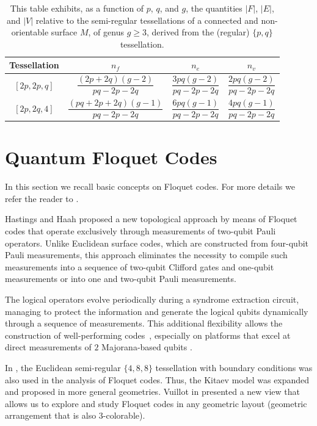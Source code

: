\documentclass[%
reprint,
amsmath,amssymb,
aps,
]{revtex4-2}
\begin{document}
\begin{table}
	\caption{	\label{tabela:N_f-N_e-N_v-tessel-derivada-em-funcao-de-p-q-g-nao-orientavel}
		This table exhibits, as a function of $ p $, $ q $, and $ g $, the quantities $|F| $, $ |E|$, and $|V|$ relative to the semi-regular tessellations of a connected and non-orientable surface $M$, of genus $ g\geq 3 $, derived from the (regular) $\{p,q\}$ tessellation.}
	\begin{ruledtabular}
	\begin{tabular}{||c|c|c|c||}
		Tessellation	&	$ n_f $	&	$ n_e $	& $n_v$ \\	
		\hline	$[2p,2p,q]$	&	$ \dfrac{(2p+2q)(g-2)}{pq-2p-2q} $	&	$ \dfrac{3pq(g-2)}{pq-2p-2q}$	& 	$ \dfrac{2pq(g-2)}{pq-2p-2q}$ \\	
		\hline	$[2p,2q,4]$	&	$ \dfrac{(pq+2p+2q)(g-1)}{pq-2p-2q} $	&	$ \dfrac{6pq(g-1)}{pq-2p-2q} $	&	$ \dfrac{4pq(g-1)}{pq-2p-2q}$ \\	
					\end{tabular}
	\end{ruledtabular}
\end{table}
		
\section{Quantum Floquet Codes}\label{reviewFloquet}

In this section we recall basic concepts on Floquet codes. For more details we refer the reader to \cite{Hastings2021, Vuillot2021, Breuckmann2016,Breuckmann2024}.

Hastings and Haah \cite{Hastings2021} proposed a new topological approach by means of Floquet codes that operate exclusively through measurements of two-qubit Pauli operators. Unlike Euclidean surface codes, which are constructed from four-qubit Pauli measurements, this approach eliminates the necessity to compile such measurements into a sequence of two-qubit Clifford gates and one-qubit measurements or into one and two-qubit Pauli measurements.

The logical operators evolve periodically during a syndrome extraction circuit, managing to protect the information and generate the logical qubits dynamically through a sequence of measurements. This additional flexibility allows the construction of well-performing codes~\cite{Gidney2021}, especially on platforms that excel at direct measurements of $2$ Majorana-based qubits \cite{Paetznick}.

In \cite{Paetznick}, the Euclidean semi-regular $\{4, 8, 8\}$ tessellation with boundary conditions was also used in the analysis of Floquet codes. Thus, the Kitaev model was expanded and proposed in more general geometries. Vuillot in \cite{Vuillot2021} presented a new view that allows us to explore and study Floquet codes in any geometric layout (geometric arrangement that is also $3$-colorable).
\end{document}
